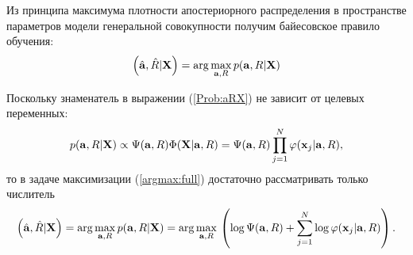 Из принципа максимума плотности апостериорного распределения в пространстве параметров модели генеральной совокупности получим байесовское правило обучения:
\begin{equation}
	\label{argmax:full}
	\left(\hat{\mathbf{a}},\hat R|\mathbf{X}\right) = \arg\underset{\mathbf{a},R}\max\, p(\mathbf{a},R|\mathbf{X})
\end{equation}

Поскольку знаменатель в выражении (\ref{Prob:aRX}) не зависит от целевых переменных: 
$$p(\mathbf{a},R|\mathbf{X}) 
	\propto \Psi(\mathbf{a},R) \Phi(\mathbf{X}|\mathbf{a},R) 
	=  \Psi(\mathbf{a},R) \prod_{j=1}^N \varphi(\mathbf{x}_j|\mathbf{a},R),$$
то в задаче максимизации (\ref{argmax:full}) достаточно рассматривать только числитель
$$\left(\hat{\mathbf{a}},\hat R|\mathbf{X}\right)
	= \arg\underset{\mathbf{a},R}\max\, p(\mathbf{a},R|\mathbf{X}) 
	= \arg\underset{\mathbf{a},R}\max\, \left(\log\Psi(\mathbf{a},R) + \sum_{j=1}^N\log\varphi(\mathbf{x}_j|\mathbf{a},R)\right). $$


